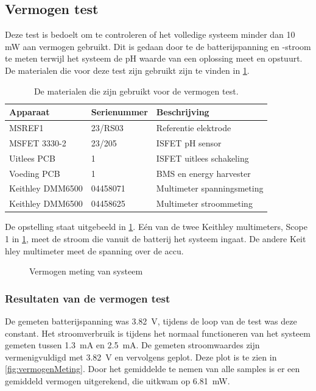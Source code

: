 \subsection{Vermogen test} \label{sec:vermogenTest}
Deze test is bedoelt om te controleren of het volledige systeem minder dan 10 mW aan vermogen gebruikt. Dit is gedaan door te de batterijspanning en -stroom te meten terwijl het systeem de pH waarde van een oplossing meet en opstuurt. De materialen die voor deze test zijn gebruikt zijn te vinden in \cref{tab:testMaterialen3}.
\begin{table}[!htbp]
    \centering
    \begin{tabular}{l|l|l}
        Apparaat         & Serienummer & Beschrijving \\
        \hline
        MSREF1           & 23/RS03     & Referentie elektrode       \\
        MSFET 3330-2     & 23/205      & ISFET pH sensor            \\
        Uitlees PCB      & 1           & ISFET uitlees schakeling   \\
        Voeding PCB      & 1           & BMS en energy harvester    \\
        Keithley DMM6500 & 04458071    & Multimeter spanningsmeting \\
        Keithley DMM6500 & 04458625    & Multimeter stroommeting    \\
        \hline
    \end{tabular}
    \caption{De materialen die zijn gebruikt voor de vermogen test.}
    \label{tab:testMaterialen3}
\end{table}
De opstelling staat uitgebeeld in \cref{fig:vermogenMetingOpstelling}. Eén van de twee Keithley multimeters, Scope 1 in \cref{fig:vermogenMetingOpstelling}, meet de stroom die vanuit de batterij het systeem ingaat. De andere Keit hley multimeter meet de spanning over de accu.


\begin{figure}[!htbp]
    \centering
    \def\svgwidth{0.6\textwidth}
    
    \caption{Vermogen meting van systeem}
    \label{fig:vermogenMetingOpstelling}
\end{figure}

\subsubsection{Resultaten van de vermogen test}
De gemeten batterijspanning was \qty{3.82}{\volt}, tijdens de loop van de test was deze constant. Het stroomverbruik is tijdens het normaal functioneren van het systeem gemeten tussen \qty{1.3}{\milli\ampere} en \qty{2.5}{\milli\ampere}. De gemeten stroomwaardes zijn vermenigvuldigd met \qty{3.82}{\volt} en vervolgens geplot. Deze plot is te zien in \cref{fig:vermogenMeting}. Door het gemiddelde te nemen van alle samples is er een gemiddeld vermogen uitgerekend, die uitkwam op \qty{6.81}{\milli\watt}.

